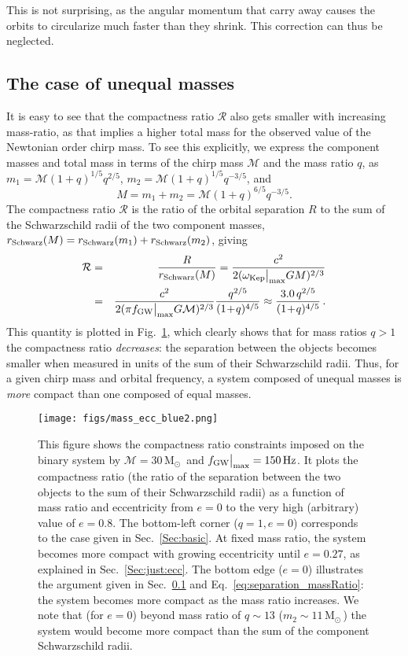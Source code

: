 \documentclass{andp2012}%
\def\w{\omega}
\def\bea{\begin{eqnarray}}
\def\eea{\end{eqnarray}}
\newcommand{\refigure}[1]{Fig.~\ref{#1}}
\newcommand{\refsec}[1]{Sec.\ \ref{#1}}
\newcommand{\refeqn}[1]{Eq.\ \ref{#1}}
\newcommand{\caveatformat}[1]{\subsection{#1}}
\def\Mc{\mathcal{M}}
\def\submax{\big|_{\rm max}}
\def\fgwmax{f_{\rm GW} \submax}
\def\wkep{\w_{\rm Kep}}
\def\wkepmax{\wkep\submax}
\newcommand{\Msun}{\ensuremath{\mathrm{M}_\odot\,}}
\begin{document}
This is not surprising,
as the angular momentum
that \GWs carry away causes the orbits to circularize
much faster than they shrink\cite{Peters:1963ux, Peters:1964qza}.
This correction can thus be neglected.

\caveatformat{The case of unequal masses}
\label{Sec:just:q}
It is easy to see that the compactness ratio $\mathcal{R}$ also gets smaller
with increasing mass-ratio,
as that implies a higher total mass for the observed value of the Newtonian order chirp mass.
To see this explicitly,
we express the component masses and total mass in terms of the chirp mass $\Mc$ and the mass ratio $q$, as
$m_1 = \Mc (1+q)^{1/5}q^{2/5}$, $m_2 =  \Mc (1+q)^{1/5}q^{-3/5}$, and
%
\begin{equation}
  M  =  m_1 + m_2 = \Mc (1 + q)^{6/5}q^{-3/5}.
  \label{m_as_mchirp_and_q}
\end{equation}
%
The compactness ratio $\mathcal{R}$ is the ratio of the orbital
separation $R$ to the sum of the Schwarzschild radii of the two
component masses, $r_{\rm Schwarz}(M) = r_{\rm Schwarz}(m_1) + r_{\rm
  Schwarz}(m_2)$, giving
%
\bea
\mathcal{R}&=&\frac{R}{r_{\rm Schwarz}(M)}
	= \frac{c^2}{2(\wkepmax GM)^{2/3}}	\nonumber \\
	&=& \frac{c^2}{2(\pi \fgwmax G\Mc)^{2/3}} \frac{q^{2/5}}{(1\!+\!q)^{4/5}}
	\approx \frac{3.0 \,q^{2/5}}{(1\!+\!q)^{4/5}}\,.
\label{eq:separation_massRatio}
\eea
%
This quantity is plotted in \refigure{fig:separationAndFrequency},
which clearly shows that for mass ratios $q>1$ the compactness ratio
{\it decreases}: the separation between the objects becomes smaller
when measured in units of the sum of their Schwarzschild radii.  Thus,
for a given chirp mass and orbital frequency, a system composed of
unequal masses is {\it more} compact than one composed of equal masses.

\begin{figure}[t]
\centering
\texttt{[image: figs/mass\_ecc\_blue2.png]}
\caption{
  This figure shows the compactness ratio constraints
  imposed on the binary system by
  $\Mc = 30 \, \Msun$ and $\fgwmax = 150 \, {\rm Hz}$.
  It plots the compactness ratio (the ratio of the separation between
  the two objects to the sum of their Schwarzschild radii) as a function of
  mass ratio and eccentricity
  from $e=0$ to the very high (arbitrary) value of $e=0.8$.
  The bottom-left corner ($q=1,e=0$)
  corresponds to the case given in \refsec{Sec:basic}.
  At fixed mass ratio, the system becomes more compact
  with growing eccentricity until $e=0.27$,
  as explained in \refsec{Sec:just:ecc}.
  The bottom edge ($e=0$) illustrates the argument given in
  \refsec{Sec:just:q} and \refeqn{eq:separation_massRatio}:
  the system becomes more compact as the mass ratio increases.
  We note that (for $e=0$) beyond mass ratio of
  $q\sim 13$ ($m_2\sim11\,\Msun\!$) the system 
  would become more compact than the sum of
  the component Schwarzschild radii. 
}
\label{fig:separationAndFrequency}
\end{figure}
\end{document}

